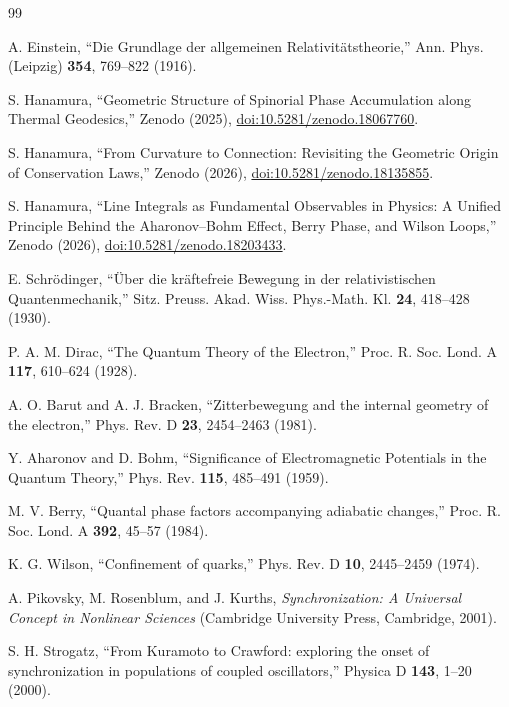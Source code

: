 \documentclass[
 reprint,
 amsmath,amssymb,
 aps,
 prb,
]{revtex4-2}
\numberwithin{equation}{section}
\begin{document}
\begin{thebibliography}{99}

A. Einstein, ``Die Grundlage der allgemeinen Relativit{\"a}tstheorie,'' Ann. Phys. (Leipzig) \textbf{354}, 769--822 (1916).

S. Hanamura, ``Geometric Structure of Spinorial Phase Accumulation along Thermal Geodesics,'' Zenodo (2025), \href{https://doi.org/10.5281/zenodo.18067760}{doi:10.5281/zenodo.18067760}.

S. Hanamura, ``From Curvature to Connection: Revisiting the Geometric Origin of Conservation Laws,'' Zenodo (2026), \href{https://doi.org/10.5281/zenodo.18135855}{doi:10.5281/zenodo.18135855}.

S. Hanamura, ``Line Integrals as Fundamental Observables in Physics: A Unified Principle Behind the Aharonov--Bohm Effect, Berry Phase, and Wilson Loops,'' Zenodo (2026), \href{https://doi.org/10.5281/zenodo.18203433}{doi:10.5281/zenodo.18203433}.

E. Schr{\"o}dinger, ``{\"U}ber die kr{\"a}ftefreie Bewegung in der relativistischen Quantenmechanik,'' Sitz. Preuss. Akad. Wiss. Phys.-Math. Kl. \textbf{24}, 418--428 (1930).

P. A. M. Dirac, ``The Quantum Theory of the Electron,'' Proc. R. Soc. Lond. A \textbf{117}, 610--624 (1928).

A. O. Barut and A. J. Bracken, ``Zitterbewegung and the internal geometry of the electron,'' Phys. Rev. D \textbf{23}, 2454--2463 (1981).

Y. Aharonov and D. Bohm, ``Significance of Electromagnetic Potentials in the Quantum Theory,'' Phys. Rev. \textbf{115}, 485--491 (1959).

M. V. Berry, ``Quantal phase factors accompanying adiabatic changes,'' Proc. R. Soc. Lond. A \textbf{392}, 45--57 (1984).

K. G. Wilson, ``Confinement of quarks,'' Phys. Rev. D \textbf{10}, 2445--2459 (1974).

A. Pikovsky, M. Rosenblum, and J. Kurths, \textit{Synchronization: A Universal Concept in Nonlinear Sciences} (Cambridge University Press, Cambridge, 2001).

S. H. Strogatz, ``From Kuramoto to Crawford: exploring the onset of synchronization in populations of coupled oscillators,'' Physica D \textbf{143}, 1--20 (2000).


\end{thebibliography}
\end{document}
